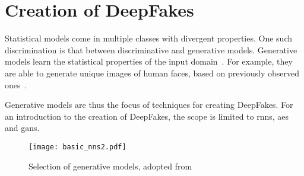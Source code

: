 \section{Creation of DeepFakes}\label{sect:creation-of-deepfakes}
Statistical models come in multiple classes with divergent properties.
One such discrimination is that between discriminative and generative models.
Generative models learn the statistical properties of the input domain~\cite[cf.][\nopp~651\psqq]{Goodfellow.2016}.
For example, they are able to generate unique images of human faces, based on
previously observed ones~\cite{Karras.2019}. 

\par
Generative models are thus the focus of techniques for creating DeepFakes.
For an introduction to the creation of DeepFakes, the scope is limited to
\glspl{rnn}, \glspl{ae} and \glspl{gan}.
\begin{figure}[h]
    \center{}
    \texttt{[image: basic\_nns2.pdf]}
    \caption{Selection of generative models, adopted from~\cite{Mirsky.2020}}\label{fig:drain-parse-tree}
\end{figure}
